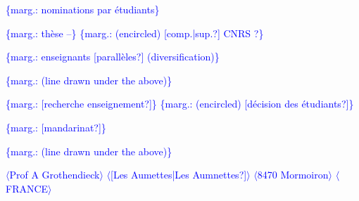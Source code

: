 \documentclass[11pt]{article}
\newcommand{\scanpage}[1]{\par\bigskip\noindent{\small\sffamily[scan #1]}\par}
\newcommand{\mspage}[1]{{\small\sffamily[p.\,#1]}}
\newcommand{\hand}[1]{\textcolor{blue}{#1}}
\newcommand{\inserted}[2][]{\textcolor{blue}{$\langle$#2$\rangle$}}
\newcommand{\margin}[1]{\textcolor{blue}{\{\textsf{marg.:} #1\}}}
\newcommand{\unsure}[1]{[#1?]}
\begin{document}
\margin{nominations par étudiants}

\margin{thèse --} \margin{(encircled) \unsure{comp.|sup.} CNRS ?}

\margin{enseignants \unsure{parallèles} (diversification)}

\margin{(line drawn under the above)}

\margin{\unsure{recherche enseignement}} \margin{(encircled) \unsure{décision des étudiants}}

\margin{\unsure{mandarinat}}

\margin{(line drawn under the above)}

\mspage{\hand{273}}

\clearpage
\scanpage{119/282}
\inserted{Prof A Grothendieck}
\inserted{\unsure{Les Aumettes|Les Aumnettes}}
\inserted{8470 Mormoiron}
\inserted{FRANCE}
\end{document}
